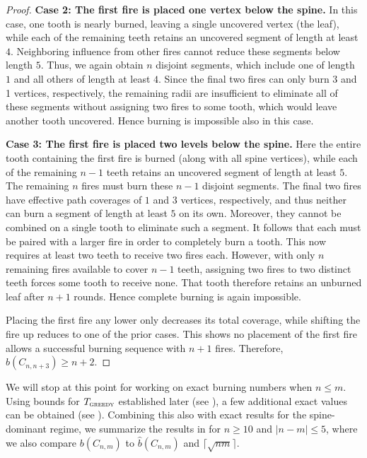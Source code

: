 \documentclass{article}
\newcommand{\gr}{\textsc{greedy}}
\begin{document}
\begin{proof}
\medskip
\noindent\textbf{Case 2: The first fire is placed one vertex below the spine.} In this case, one tooth is nearly burned, leaving a single uncovered vertex (the leaf), while each of the remaining teeth retains an uncovered segment of length at least $4$. Neighboring influence from other fires cannot reduce these segments below length $5$. Thus, we again obtain $n$ disjoint segments, which include one of length $1$ and all others of length at least $4$. Since the final two fires can only burn 3 and 1 vertices, respectively, the remaining radii are insufficient to eliminate all of these segments without assigning two fires to some tooth, which would leave another tooth uncovered. Hence burning is impossible also in this case.

\medskip
\noindent\textbf{Case 3: The first fire is placed two levels below the spine.} Here the entire tooth containing the first fire is burned (along with all spine vertices), while each of the remaining $n-1$ teeth retains an uncovered segment of length at least $5$. The remaining $n$ fires must burn these $n-1$ disjoint segments. The final two fires have effective path coverages of $1$ and $3$ vertices, respectively, and thus neither can burn a segment of length at least $5$ on its own. Moreover, they cannot be combined on a single tooth to eliminate such a segment. It follows that each must be paired with a larger fire in order to completely burn a tooth. This now requires at least two teeth to receive two fires each. However, with only $n$ remaining fires available to cover $n-1$ teeth, assigning two fires to two distinct teeth forces some tooth to receive none. That tooth therefore retains an unburned leaf after $n+1$ rounds. Hence complete burning is again impossible.

\medskip
Placing the first fire any lower only decreases its total coverage, while shifting the fire up reduces to one of the prior cases. This shows no placement of the first fire allows a successful burning sequence with $n+1$ fires. Therefore,
$b(C_{n,n+3}) \ge n+2$.
\end{proof}



We will stop at this point for working on exact burning numbers when $n \le m$. Using bounds for $T_\gr$ established later (see ), a few additional exact values can be obtained (see ). Combining this also with exact results for the spine-dominant regime, we summarize the results in  for $n \ge 10$ and $|n-m| \le 5$, where we also compare $b(C_{n,m})$ to $\hat b(C_{n,m})$ and $\lceil \sqrt{nm} \rceil$. 
\end{document}
